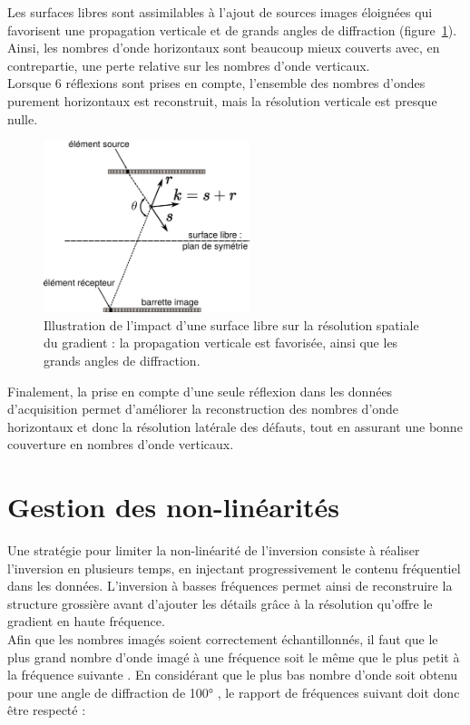 Les surfaces libres sont assimilables à l'ajout de sources images éloignées qui favorisent une propagation verticale et de grands angles de diffraction (figure~\ref{app:reso_surf_libre}). Ainsi, les nombres d'onde horizontaux sont beaucoup mieux couverts avec, en contrepartie, une perte relative sur les nombres d'onde verticaux.  \\
Lorsque 6 réflexions sont prises en compte, l'ensemble des nombres d'ondes purement horizontaux est reconstruit, mais la résolution verticale est presque nulle.
\begin{figure}[!h]
	\centering
	\includegraphics[height=5cm]{img/reso_surf_libre.png}
	\caption{Illustration de l'impact d'une surface libre sur la résolution spatiale du gradient : la propagation verticale est favorisée, ainsi que les grands angles de diffraction.\label{app:reso_surf_libre}}
\end{figure}



Finalement, la prise en compte d'une seule réflexion dans les données d'acquisition permet d'améliorer la reconstruction des nombres d'onde horizontaux et donc la résolution latérale des défauts, tout en assurant une bonne couverture en nombres d'onde verticaux.


\section{Gestion des non-linéarités}
Une stratégie pour limiter la non-linéarité de l'inversion consiste à réaliser l'inversion en plusieurs temps, en injectant progressivement le contenu fréquentiel dans les données. L'inversion à basses fréquences permet ainsi de reconstruire la structure grossière avant d'ajouter les détails grâce à la résolution qu'offre le gradient en haute fréquence.\\



Afin que les nombres imagés soient correctement échantillonnés, il faut que le plus grand nombre d'onde imagé à une fréquence soit le même que le plus petit à la fréquence suivante \citep{sirgue}. En considérant que le plus bas nombre d'onde soit obtenu pour une angle de diffraction de 100° , le rapport de fréquences suivant doit donc être respecté : 

